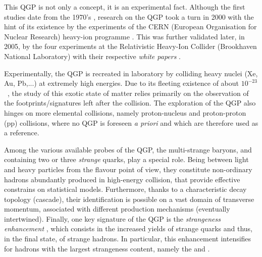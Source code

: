 This QGP is not only a concept, it is an experimental fact. Although the first studies date from the 1970's \cite{carruthersQuarkiumBizarreFermi1974, harringtonHighDensityPhaseTransitions1974, collinsSuperdenseMatterNeutrons1975}, research on the QGP took a turn in 2000 with the hint of its existence by the experiments of the CERN (European Organisation for Nuclear Research) heavy-ion programme \cite{cernNewStateMatter2023}. This was further validated later, in 2005, by the four experiments at the Relativistic Heavy-Ion Collider (Brookhaven National Laboratory) with their respective \emph{white papers} \cite{ludlamHUNTINGQUARKGLUON2005, arseneQuarkGluonPlasma2005, backPHOBOSPerspectiveDiscoveries2005, phenixcollaborationFormationDensePartonic2005, starcollaborationExperimentalTheoreticalChallenges2005}.

Experimentally, the QGP is recreated in laboratory by colliding heavy nuclei (Xe, Au, Pb,...) at extremely high energies. Due to its fleeting existence of about $10^{-23}$~\second, the study of this exotic state of matter relies primarily on the observation of the footprints/signatures left after the collision. The exploration of the QGP also hinges on more elemental collisions, namely proton-nucleus and proton-proton (pp) collisions, where no QGP is foreseen \emph{a priori} and which are therefore used as a reference.

Among the various available probes of the QGP, the multi-strange baryons, \rmXi and \rmOmega containing two or three \textit{strange} quarks, play a special role. Being between light and heavy particles from the flavour point of view, they constitute non-ordinary hadrons abundantly produced in high-energy collision, that provide effective constrains on statistical models. Furthermore, thanks to a characteristic decay topology (cascade), their identification is possible on a vast domain of transverse momentum, associated with different production mechanisms (eventually intertwined). Finally, one key signature of the QGP is the \textit{strangeness enhancement} \cite{rafelski1981statistical}, which consists in the increased yields of strange quarks and thus, in the final state, of strange hadrons. In particular, this enhancement intensifies for hadrons with the largest strangeness content, namely the \rmXi and \rmOmega.\\

